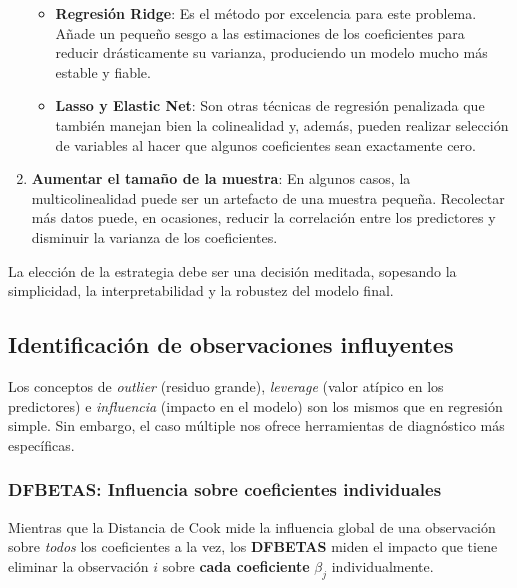 \documentclass[
  letterpaper,
  DIV=11,
  numbers=noendperiod]{scrreprt}
\providecommand{\tightlist}{%
  \setlength{\itemsep}{0pt}\setlength{\parskip}{0pt}}
\begin{document}
\begin{tcolorbox}
\begin{enumerate}
  \begin{itemize}
  \tightlist
  \item
    \textbf{Regresión Ridge}: Es el método por excelencia para este
    problema. Añade un pequeño sesgo a las estimaciones de los
    coeficientes para reducir drásticamente su varianza, produciendo un
    modelo mucho más estable y fiable.
  \item
    \textbf{Lasso y Elastic Net}: Son otras técnicas de regresión
    penalizada que también manejan bien la colinealidad y, además,
    pueden realizar selección de variables al hacer que algunos
    coeficientes sean exactamente cero.
  \end{itemize}
\item
  \textbf{Aumentar el tamaño de la muestra}: En algunos casos, la
  multicolinealidad puede ser un artefacto de una muestra pequeña.
  Recolectar más datos puede, en ocasiones, reducir la correlación entre
  los predictores y disminuir la varianza de los coeficientes.
\end{enumerate}

La elección de la estrategia debe ser una decisión meditada, sopesando
la simplicidad, la interpretabilidad y la robustez del modelo final.

\end{tcolorbox}

\subsection{Identificación de observaciones
influyentes}\label{identificaciuxf3n-de-observaciones-influyentes}

Los conceptos de \emph{outlier} (residuo grande), \emph{leverage} (valor
atípico en los predictores) e \emph{influencia} (impacto en el modelo)
son los mismos que en regresión simple. Sin embargo, el caso múltiple
nos ofrece herramientas de diagnóstico más específicas.

\subsubsection{DFBETAS: Influencia sobre coeficientes
individuales}\label{dfbetas-influencia-sobre-coeficientes-individuales}

Mientras que la Distancia de Cook mide la influencia global de una
observación sobre \emph{todos} los coeficientes a la vez, los
\textbf{DFBETAS} miden el impacto que tiene eliminar la observación
\(i\) sobre \textbf{cada coeficiente} \(\beta_j\) individualmente.
\end{document}

